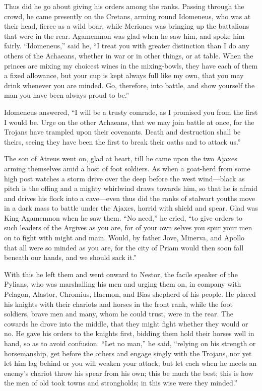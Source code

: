 Thus did he go about giving his orders among the ranks. Passing through
the crowd, he came presently on the Cretans, arming round Idomeneus, who
was at their head, fierce as a wild boar, while Meriones was bringing up
the battalions that were in the rear. Agamemnon was glad when he saw him,
and spoke him fairly. “Idomeneus,” said he, “I treat you with greater
distinction than I do any others of the Achaeans, whether in war or in
other things, or at table. When the princes are mixing my choicest wines
in the mixing-bowls, they have each of them a fixed allowance, but your
cup is kept always full like my own, that you may drink whenever you are
minded. Go, therefore, into battle, and show yourself the man you have
been always proud to be.”

Idomeneus answered, “I will be a trusty comrade, as I promised you from
the first I would be. Urge on the other Achaeans, that we may join battle
at once, for the Trojans have trampled upon their covenants. Death and
destruction shall be theirs, seeing they have been the first to break
their oaths and to attack us.”

The son of Atreus went on, glad at heart, till he came upon the two Ajaxes
arming themselves amid a host of foot soldiers. As when a goat-herd from
some high post watches a storm drive over the deep before the west wind—black
as pitch is the offing and a mighty whirlwind draws towards him, so that
he is afraid and drives his flock into a cave—even thus did the
ranks of stalwart youths move in a dark mass to battle under the Ajaxes,
horrid with shield and spear. Glad was King Agamemnon when he saw them.
“No need,” he cried, “to give orders to such leaders of the Argives as you
are, for of your own selves you spur your men on to fight with might and
main. Would, by father Jove, Minerva, and Apollo that all were so minded
as you are, for the city of Priam would then soon fall beneath our hands,
and we should sack it.”

With this he left them and went onward to Nestor, the facile speaker of
the Pylians, who was marshalling his men and urging them on, in company
with Pelagon, Alastor, Chromius, Haemon, and Bias shepherd of his people.
He placed his knights with their chariots and horses in the front rank,
while the foot soldiers, brave men and many, whom he could trust, were in
the rear. The cowards he drove into the middle, that they might fight
whether they would or no. He gave his orders to the knights first, bidding
them hold their horses well in hand, so as to avoid confusion. “Let no
man,” he said, “relying on his strength or horsemanship, get before the
others and engage singly with the Trojans, nor yet let him lag behind or
you will weaken your attack; but let each when he meets an enemy’s chariot
throw his spear from his own; this be much the best; this is how the men
of old took towns and strongholds; in this wise were they minded.”

